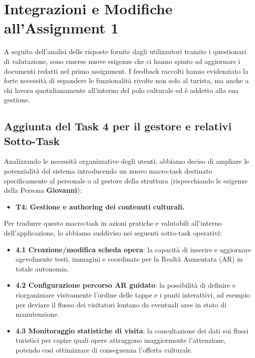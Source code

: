 \section{Integrazioni e Modifiche all'Assignment 1}

A seguito dell'analisi delle risposte fornite dagli utilizzatori tramite i questionari di valutazione, sono emerse nuove esigenze che ci hanno spinto ad aggiornare i documenti redatti nel primo assignment. I feedback raccolti hanno evidenziato la forte necessità di espandere le funzionalità rivolte non solo al turista, ma anche a chi lavora quotidianamente all'interno del polo culturale ed è addetto alla sua gestione.

\subsection{Aggiunta del Task 4 per il gestore e relativi Sotto-Task}
Analizzando le necessità organizzative degli utenti, abbiamo deciso di ampliare le potenzialità del sistema introducendo un nuovo macro-task destinato specificamente al personale o al gestore della struttura (rispecchiando le esigenze della Persona \textbf{Giovanni}):

\begin{itemize}[nosep, leftmargin=1.4em]
    \item \textbf{T4: Gestione e authoring dei contenuti culturali.}
\end{itemize}

Per tradurre questo macro-task in azioni pratiche e valutabili all'interno dell'applicazione, lo abbiamo suddiviso nei seguenti sotto-task operativi:
\begin{itemize}[nosep, leftmargin=1.4em]
    \item \textbf{4.1 Creazione/modifica scheda opera}: la capacità di inserire e aggiornare agevolmente testi, immagini e coordinate per la Realtà Aumentata (AR) in totale autonomia.
    \item \textbf{4.2 Configurazione percorso AR guidato}: la possibilità di definire e riorganizzare visivamente l'ordine delle tappe e i punti interattivi, ad esempio per deviare il flusso dei visitatori lontano da eventuali aree in stato di manutenzione.
    \item \textbf{4.3 Monitoraggio statistiche di visita}: la consultazione dei dati sui flussi turistici per capire quali opere attraggono maggiormente l'attenzione, potendo così ottimizzare di conseguenza l'offerta culturale.
\end{itemize}

